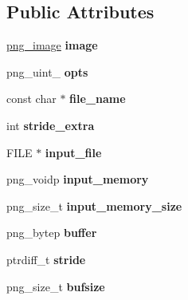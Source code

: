 \subsection*{Public Attributes}
\begin{DoxyCompactItemize}
\item 
\hypertarget{class_image_a5b36f5484a163a568f8de78549a2ece8}{\hyperlink{structpng__image}{png\+\_\+image} {\bfseries image}}\label{class_image_a5b36f5484a163a568f8de78549a2ece8}

\item 
\hypertarget{class_image_a7d337417a1baabade6a944a0cf44e2ec}{png\+\_\+uint\+\_ {\bfseries opts}}\label{class_image_a7d337417a1baabade6a944a0cf44e2ec}

\item 
\hypertarget{class_image_adcf8dc6e690ecc7babe7e2498f5d9fe9}{const char $\ast$ {\bfseries file\+\_\+name}}\label{class_image_adcf8dc6e690ecc7babe7e2498f5d9fe9}

\item 
\hypertarget{class_image_a9e990c6205d70af92d61af7e183a6f69}{int {\bfseries stride\+\_\+extra}}\label{class_image_a9e990c6205d70af92d61af7e183a6f69}

\item 
\hypertarget{class_image_a8a3a72fa96f5a0c64078b8ecfa87d2d8}{F\+I\+L\+E $\ast$ {\bfseries input\+\_\+file}}\label{class_image_a8a3a72fa96f5a0c64078b8ecfa87d2d8}

\item 
\hypertarget{class_image_a30fa860fa46d252f004f32955062e1e0}{png\+\_\+voidp {\bfseries input\+\_\+memory}}\label{class_image_a30fa860fa46d252f004f32955062e1e0}

\item 
\hypertarget{class_image_a8bd1f7c1091a63eb373567b12402edf9}{png\+\_\+size\+\_\+t {\bfseries input\+\_\+memory\+\_\+size}}\label{class_image_a8bd1f7c1091a63eb373567b12402edf9}

\item 
\hypertarget{class_image_add50466b796c295c6b2137c2c807b10b}{png\+\_\+bytep {\bfseries buffer}}\label{class_image_add50466b796c295c6b2137c2c807b10b}

\item 
\hypertarget{class_image_a31b346c1eb06c8dd75a8a71752b73faa}{ptrdiff\+\_\+t {\bfseries stride}}\label{class_image_a31b346c1eb06c8dd75a8a71752b73faa}

\item 
\hypertarget{class_image_aa0f5f989c6f446ba9417aa3fe9cf5242}{png\+\_\+size\+\_\+t {\bfseries bufsize}}\label{class_image_aa0f5f989c6f446ba9417aa3fe9cf5242}


\end{DoxyCompactItemize}
